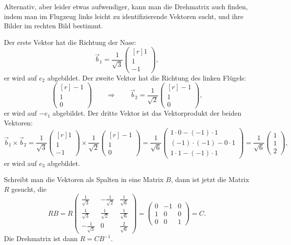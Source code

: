 \begin{diskussion}
Alternativ, aber leider etwas aufwendiger, kann man die Drehmatrix
auch finden, indem man im Flugzeug links leicht zu identifizierende
Vektoren sucht, und ihre Bilder im rechten Bild bestimmt.

Der erste Vektor hat die Richtung der Nase:
\[
\vec{b}_1
=
\frac{1}{\sqrt{3}}\begin{pmatrix*}[r] 1\\1\\-1\end{pmatrix*},
\]
er wird auf $e_2$ abgebildet.
Der zweite Vektor hat die Richtung des linken Flügels:
\[
\begin{pmatrix*}[r]-1\\1\\0\end{pmatrix*}
\qquad\Rightarrow\qquad
\vec{b}_2
=
\frac{1}{\sqrt{2}}
\begin{pmatrix*}[r]-1\\1\\0\end{pmatrix*},
\]
er wird auf $-e_1$ abgebildet.
Der dritte Vektor ist das Vektorprodukt der beiden Vektoren:
\[
\vec{b}_1\times \vec{b}_2
=
\frac{1}{\sqrt{3}}
\begin{pmatrix*}[r] 1\\1\\-1\end{pmatrix*}
\times
\frac{1}{\sqrt{2}}
\begin{pmatrix*}[r]-1\\1\\0\end{pmatrix*}
=
\frac{1}{\sqrt{6}}
\begin{pmatrix}
1\cdot 0-(-1)\cdot 1\\
(-1)\cdot(-1)-0\cdot 1\\
1\cdot 1-(-1)\cdot 1
\end{pmatrix}
=
\frac{1}{\sqrt{6}}
\begin{pmatrix}
1\\1\\2
\end{pmatrix},
\]
er wird auf $e_3$ abgebildet.

Schreibt man die Vektoren als Spalten in eine Matrix $B$, dann ist
jetzt die Matrix $R$ gesucht, die
\[
RB
=
R
\begin{pmatrix}
 \frac{1}{\sqrt{3}}&-\frac{1}{\sqrt{2}}&\frac{1}{\sqrt{6}}\\
 \frac{1}{\sqrt{3}}& \frac{1}{\sqrt{2}}&\frac{1}{\sqrt{6}}\\
-\frac{1}{\sqrt{3}}&       0           &\frac{2}{\sqrt{6}}
\end{pmatrix}
=
\begin{pmatrix}
 0&-1& 0\\
 1& 0& 0\\
 0& 0& 1
\end{pmatrix}
=
C.
\]
Die Drehmatrix ist dann $R=CB^{-1}$.


\end{diskussion}
